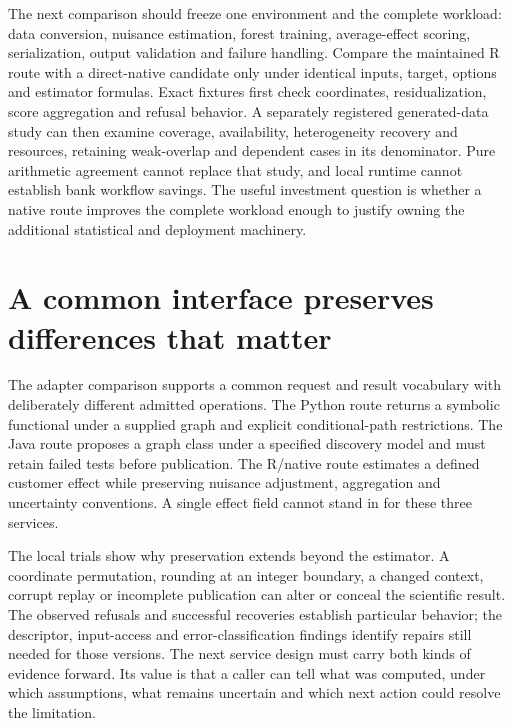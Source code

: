 The next comparison should freeze one environment and the complete
workload: data conversion, nuisance estimation, forest training,
average-effect scoring, serialization, output validation and failure
handling. Compare the maintained R route with a direct-native candidate
only under identical inputs, target, options and estimator formulas.
Exact fixtures first check coordinates, residualization, score
aggregation and refusal behavior. A separately registered generated-data
study can then examine coverage, availability, heterogeneity recovery
and resources, retaining weak-overlap and dependent cases in its
denominator. Pure arithmetic agreement cannot replace that study, and
local runtime cannot establish bank workflow savings. The useful
investment question is whether a native route improves the complete
workload enough to justify owning the additional statistical and
deployment machinery. \label{exec13:grf-adapter-end}

\section{A common interface preserves differences that matter}

The adapter comparison supports a common request and result vocabulary with deliberately different admitted operations. The Python route returns a symbolic functional under a supplied graph and explicit conditional-path restrictions. The Java route proposes a graph class under a specified discovery model and must retain failed tests before publication. The R/native route estimates a defined customer effect while preserving nuisance adjustment, aggregation and uncertainty conventions. A single effect field cannot stand in for these three services.

The local trials show why preservation extends beyond the estimator. A coordinate permutation, rounding at an integer boundary, a changed context, corrupt replay or incomplete publication can alter or conceal the scientific result. The observed refusals and successful recoveries establish particular behavior; the descriptor, input-access and error-classification findings identify repairs still needed for those versions. The next service design must carry both kinds of evidence forward. Its value is that a caller can tell what was computed, under which assumptions, what remains uncertain and which next action could resolve the limitation.
